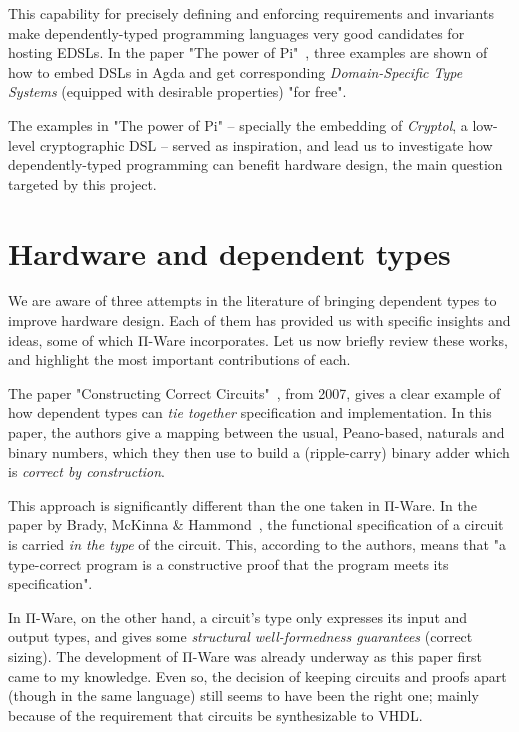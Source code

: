             This capability for precisely defining and enforcing requirements and invariants make
            dependently-typed programming languages very good candidates for hosting \acp{EDSL}.
            In the paper "The power of Pi"~\cite{power-pi}, three examples are shown of how to
            embed \acp{DSL} in Agda and get corresponding \emph{Domain-Specific Type Systems}
            (equipped with desirable properties) "for free".

            The examples in "The power of Pi" – specially the embedding of \emph{Cryptol},
            a low-level cryptographic \ac{DSL} – served as inspiration,
            and lead us to investigate how dependently-typed programming can benefit hardware
            design, the main question targeted by this project.



    \section{Hardware and dependent types}
    \label{sec:hardware-dtp}
        We are aware of three attempts in the literature of bringing dependent types to improve hardware design.
        Each of them has provided us with specific insights and ideas, some of which Π-Ware incorporates.
        Let us now briefly review these works, and highlight the most important contributions of each.

        The paper "Constructing Correct Circuits"~\cite{brady-constructing}, from 2007,
        gives a clear example of how dependent types can \emph{tie together} specification and implementation.
        In this paper, the authors give a mapping between the usual, Peano-based, naturals and binary numbers,
        which they then use to build a (ripple-carry) binary adder which is \emph{correct by construction}.

        This approach is significantly different than the one taken in Π-Ware.
        In the paper by Brady, McKinna \& Hammond~,
        the functional specification of a circuit is carried \emph{in the type} of the circuit.
        This, according to the authors, means that
        "a type-correct program is a constructive proof that the program meets its specification".

        In Π-Ware, on the other hand, a circuit's type only expresses its input and output types,
        and gives some \emph{structural well-formedness guarantees} (correct sizing).
        The development of Π-Ware was already underway as this paper first came to my knowledge.
        Even so, the decision of keeping circuits and proofs apart (though in the same language)
        still seems to have been the right one; mainly because of the requirement that circuits
        be synthesizable to \ac{VHDL}.

